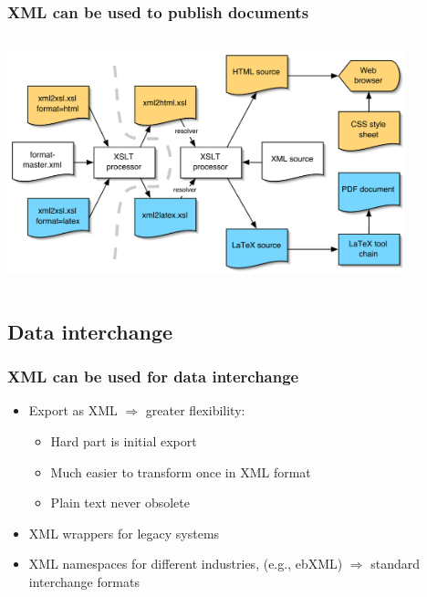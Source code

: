 \frame
{
	\frametitle{XML can be used to publish documents}
	
	\centering
	
	\begin{columns}
	
		\begin{column}{12cm}
	
			\centering
			\includegraphics[height=6.5cm,keepaspectratio]{v2_workflow}
		
		\end{column}
		
	\end{columns}
	
}




\subsection*{Data interchange}




\frame
{
	\frametitle{XML can be used for data interchange}
	
	\begin{itemize}
	
		\item Export as XML \(\Rightarrow\) greater flexibility:

		\begin{itemize}
		
			\item Hard part is initial export

			\item Much easier to transform once in XML format
			
			\item Plain text never obsolete
		
		\end{itemize}
		
		\item XML wrappers for legacy systems
		
		\item XML namespaces for different industries, (e.g., ebXML)
		\(\Rightarrow\) standard interchange formats

	\end{itemize}
}


